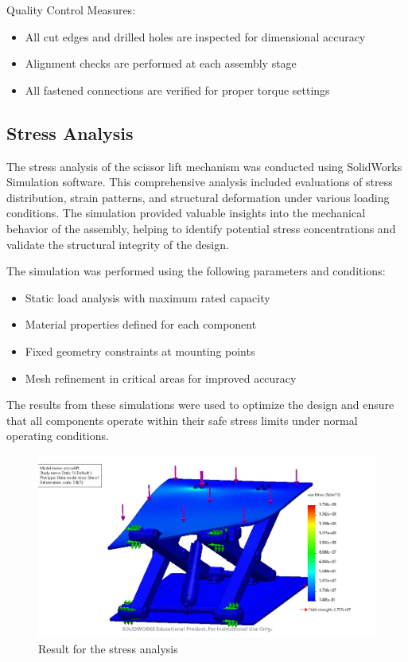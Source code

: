 \documentclass[../../main]{subfiles}
\begin{document}
Quality Control Measures:

\begin{itemize}
\item
  All cut edges and drilled holes are inspected for dimensional accuracy
\item
  Alignment checks are performed at each assembly stage
\item
  All fastened connections are verified for proper torque settings
\end{itemize}

\subsection{Stress Analysis}\label{stress-analysis}

The stress analysis of the scissor lift mechanism was conducted using
SolidWorks Simulation software. This comprehensive analysis included
evaluations of stress distribution, strain patterns, and structural
deformation under various loading conditions. The simulation provided
valuable insights into the mechanical behavior of the assembly, helping
to identify potential stress concentrations and validate the structural
integrity of the design.

The simulation was performed using the following parameters and
conditions:

\begin{itemize}
\item
  Static load analysis with maximum rated capacity
\item
  Material properties defined for each component
\item
  Fixed geometry constraints at mounting points
\item
  Mesh refinement in critical areas for improved accuracy
\end{itemize}

The results from these simulations were used to optimize the design and
ensure that all components operate within their safe stress limits under
normal operating conditions.

\begin{figure}[h!]
\centering
\includegraphics[width=\textwidth]{img/image103.jpg}
\caption{Result for the stress analysis}
\label{bmfig14}
\end{figure}
\end{document}
